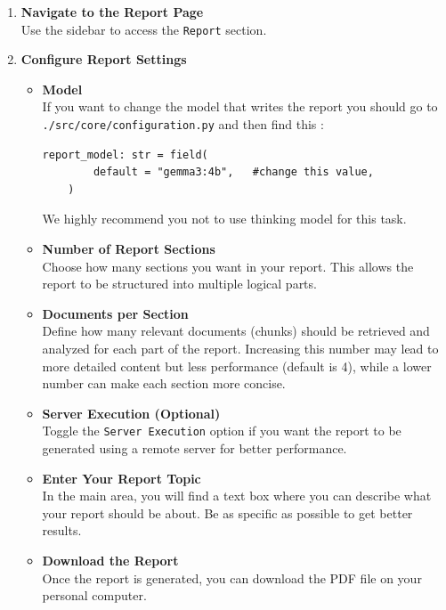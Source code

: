 \documentclass[11pt,a4paper]{report}
\begin{document}
\begin{enumerate}
    \item \textbf{Navigate to the Report Page} \\
    Use the sidebar to access the \texttt{Report} section.

    \item \textbf{Configure Report Settings}
    
    \begin{itemize}
        \item \textbf{Model} \\
        If you want to change the model that writes the report you should go to \\\texttt{./src/core/configuration.py} and then find this : 
        \begin{lstlisting}
report_model: str = field(
        default = "gemma3:4b",   #change this value,
    )
\end{lstlisting}
We highly recommend you not to use thinking model for this task. 
        


      
        \item \textbf{Number of Report Sections} \\
        Choose how many sections you want in your report. This allows the report to be structured into multiple logical parts.

        \item \textbf{Documents per Section} \\
        Define how many relevant documents (chunks) should be retrieved and analyzed for each part of the report. Increasing this number may lead to more detailed content but less performance (default is 4), while a lower number can make each section more concise.
        
        \item \textbf{Server Execution (Optional)} \\
        Toggle the \texttt{Server Execution} option if you want the report to be generated using a remote server for better performance.
        

    \item \textbf{Enter Your Report Topic} \\
    In the main area, you will find a text box where you can describe what your report should be about. Be as specific as possible to get better results.


    \item \textbf{Download the Report} \\
    Once the report is generated, you can download the PDF file on your personal computer. 
     \end{itemize}
\end{enumerate}
\end{document}
